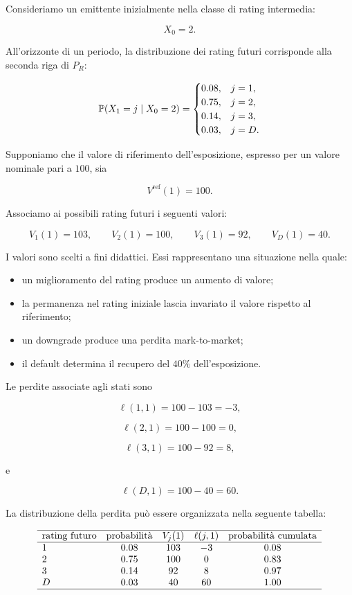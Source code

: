 Consideriamo un emittente inizialmente nella classe di rating
intermedia:

\[
X_0=2.
\]

All'orizzonte di un periodo, la distribuzione dei rating futuri
corrisponde alla seconda riga di $P_R$:

\[
\mathbb{P}(X_1=j\mid X_0=2)
=
\begin{cases}
0.08, & j=1,\\
0.75, & j=2,\\
0.14, & j=3,\\
0.03, & j=D.
\end{cases}
\]

Supponiamo che il valore di riferimento dell'esposizione, espresso per
un valore nominale pari a $100$, sia

\[
V^{\mathrm{ref}}(1)=100.
\]

Associamo ai possibili rating futuri i seguenti valori:

\[
V_1(1)=103,
\qquad
V_2(1)=100,
\qquad
V_3(1)=92,
\qquad
V_D(1)=40.
\]

I valori sono scelti a fini didattici. Essi rappresentano una
situazione nella quale:

\begin{itemize}

\item un miglioramento del rating produce un aumento di valore;

\item la permanenza nel rating iniziale lascia invariato il valore
rispetto al riferimento;

\item un downgrade produce una perdita mark-to-market;

\item il default determina il recupero del $40\%$ dell'esposizione.

\end{itemize}

Le perdite associate agli stati sono

\[
\ell(1,1)=100-103=-3,
\]

\[
\ell(2,1)=100-100=0,
\]

\[
\ell(3,1)=100-92=8,
\]

e

\[
\ell(D,1)=100-40=60.
\]

La distribuzione della perdita pu\`{o} essere organizzata nella
seguente tabella:

\[
\begin{array}{lcccc}
\hline
\text{rating futuro}
&
\text{probabilit\`{a}}
&
V_j(1)
&
\ell(j,1)
&
\text{probabilit\`{a} cumulata}
\\
\hline
1
&
0.08
&
103
&
-3
&
0.08
\\
2
&
0.75
&
100
&
0
&
0.83
\\
3
&
0.14
&
92
&
8
&
0.97
\\
D
&
0.03
&
40
&
60
&
1.00
\\
\hline
\end{array}
\]

